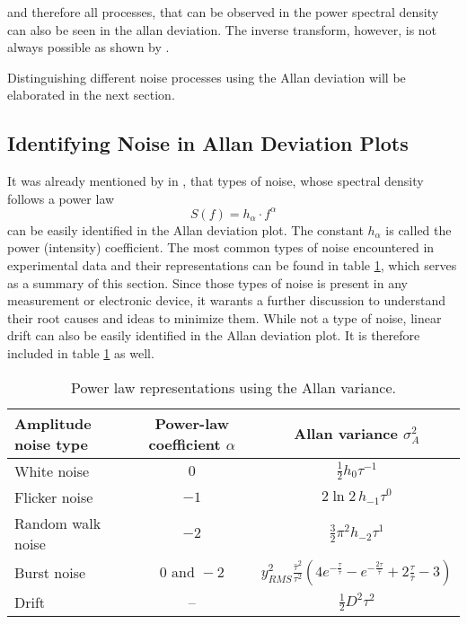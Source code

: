 and therefore all processes, that can be observed in the power spectral density can also be seen in the allan deviation. The inverse transform, however, is not always possible as shown by \citeauthor{inverse_adev} \cite{inverse_adev}.

Distinguishing different noise processes using the Allan deviation will be elaborated in the next section.

\subsection{Identifying Noise in Allan Deviation Plots}
It was already mentioned by \citeauthor{adev} in \cite{adev}, that types of noise, whose spectral density follows a power law
\begin{equation}
    S(f) = h_{\alpha} \cdot f^\alpha \label{eqn:power_law}
\end{equation}
can be easily identified in the Allan deviation plot. The constant $h_\alpha$ is called the power (intensity) coefficient. The most common types of noise encountered in experimental data and their representations can be found in table \ref{tab:adev_alpha}, which serves as a summary of this section. Since those types of noise is present in any measurement or electronic device, it warants a further discussion to understand their root causes and ideas to minimize them. While not a type of noise, linear drift can also be easily identified in the Allan deviation plot. It is therefore included in table \ref{tab:adev_alpha} as well.

\begin{table}[ht]
    \centering
    \begin{tabular}{lcc}
        \toprule
        Amplitude noise type& Power-law coefficient $\alpha$& Allan variance $\sigma_A^2$\\
        \midrule
            White noise & $0$& $\frac 1 2 h_0 \tau^{-1}$ \cite{adev_noise_types}\\
            Flicker noise& $-1$& $2 \ln 2 \, h_{-1} \tau^0$ \cite{adev_noise_types}\\
            Random walk noise& $-2$& $\frac 3 2 \pi^2 h_{-2} \tau^{1}$ \cite{adev_noise_types}\\
            Burst noise& $0 \textrm{ and } -\!2$& $y_{RMS}^2\frac{\bar \tau^2}{\tau^2} \left(4 e^{-\frac{\tau}{\bar \tau}} - e^{-\frac{2 \tau}{\bar \tau}} + 2 \frac{\tau}{\bar \tau} - 3 \right)$\\
            Drift & --& $\frac 1 2 D^2 \tau^2$ \cite{adev_drift}\\
        \bottomrule
    \end{tabular}
    \caption{Power law representations using the Allan variance.}
    \label{tab:adev_alpha}
\end{table}

